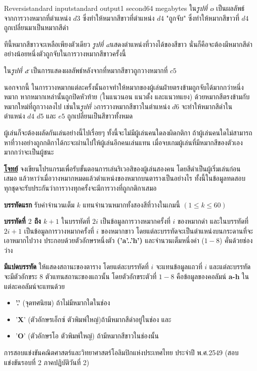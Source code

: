 \documentclass[11pt,a4paper]{article}
\begin{document}
\begin{problem}{Reversi}{standard input}{standard output}{1 second}{64 megabytes}
ใน\textit{รูปที่ ๓} เป็นผลลัพธ์จากการวางหมากที่ตำแหน่ง $d3$ ซึ่งทำให้หมากสีขาวที่ตำแหน่ง $d4$ "ถูกจับ" ซึ่งทำให้หมากสีขาวที่ $d4$ ถูกเปลี่ยนมาเป็นหมากสีดำ

ทีนี้หมากสีขาวจะเหลือเพียงตัวเดียว \textit{รูปที่ ๔}แสดงตำแหน่งที่วางได้ของสีขาว นั่นก็คือจะต้องมีหมากสีดำอย่างน้อยหนึ่งตัวถูกจับในการวางหมากสีขาวครั้งนี้

ใน\textit{รูปที่ ๕} เป็นการแสดงผลลัพธ์หลังจากที่หมากสีขาวถูกวางหมากที่ $c5$

นอกจากนี้ ในการวางหมากแต่ละครั้งนั้นอาจทำให้หมากของผู้เล่นฝ่ายตรงข้ามถูกจับได้มากกว่าหนึ่งหมาก หากหมากเหล่านั้นถูกปิดหัวท้าย (ในแนวนอน แนวตั้ง และแนวทแยง) ด้วยหมากสีตรงข้ามกับหมากใหม่ที่ถูกวางลงไป เช่นใน\textit{รูปที่ ๖}การวางหมากสีขาวในตำแหน่ง $d6$ จะทำให้หมากสีดำในตำแหน่ง $d4$ $d5$ และ $e5$ ถูกเปลี่ยนเป็นสีขาวทั้งหมด

ผู้เล่นก็จะต้องผลัดกันเล่นอย่างนี้ไปเรื่อยๆ ทั้งนี้จะไม่มีผู้เล่นคนใดลงผิดกติกา ถ้าผู้เล่นคนใดไม่สามารถหาที่วางอย่างถูกกติกาได้กะจะผ่านไปให้ผู้เล่นอีกคนเล่นแทน เมื่อจบเกมผู้เล่นที่มีหมากสีของตัวเองมากกว่าจะเป็นผู้ชนะ



\bigskip
\underline{\textbf{โจทย์}}  จงเขียนโปรแกรมเพื่อรับขั้นตอนการเล่นริเวอสิของผู้เล่นสองคน โดยสีดำเป็นผู้เริ่มเล่นก่อนเสมอ แล้วหาว่าเมื่อวางหมากหมดแล้วตำแหน่งของหมากบนตารางเป็นอย่างไร ทั้งนี้ในข้อมูลทดสอบทุกชุดจะรับประกันว่าการวางทุกครั้งจะมีการวางที่ถูกกติกาเสมอ

\InputFile

\textbf{บรรทัดแรก} รับค่าจำนวนเต็ม $k$ แทนจำนวนหมากทั้งสองสีที่วางในเกมนี้ $(1 \leq k \leq 60)$

\textbf{บรรทัดที่ $2$ ถึง $k+1$} ในบรรทัดที่ $2i$ เป็นข้อมูลการวางหมากครั้งที่ $i$ ของหมากดำ และในบรรทัดที่ $2i+1$ เป็นข้อมูลการวางหมากครั้งที่ $i$ ของหมากขาว โดยแต่ละบรรทัดจะเป็นตำแหน่งบนกระดานที่จะเอาหมากไปวาง ประกอบด้วยตัวอักษรหนึ่งตัว\textbf{ ('a'..'h')} และจำนวนเต็มหนึ่งค่า ($1-8$) คั่นด้วยช่องว่าง

\OutputFile

\textbf{มีแปดบรรทัด} ให้แสดงสถานะของตาราง โดยแต่ละบรรทัดที่ $i$ จะแทนข้อมูลแถวที่ $i$ และแต่ละบรรทัดจะมีตัวอักขระ $8$ ตัวแทนสถานะของแถวนั้น โดยตัวอักขระตัวที่ $1-8$ คือข้อมูลของคอลัมน์ \textbf{a-h} ในแต่ละคอลัมน์จะแทนด้วย
\begin{itemize}

\item \textbf{'.'} (จุดทศนิยม) ถ้าไม่มีหมากใดในช่อง
\item '\textbf{X}' (ตัวอักษรเอ็กซ์ ตัวพิมพ์ใหญ่)ถ้ามีหมากสีดำอยู่ในช่อง และ
\item '\textbf{O}' (ตัวอักษรโอ ตัวพิมพ์ใหญ่) ถ้ามีหมากสีขาวในช่องนั้น
\end{itemize}

\Examples

\begin{example}
%
\end{example}


\Source

การสอบแข่งขันคณิตศาสตร์และวิทยาศาสตร์โอลิมปิกแห่งประเทศไทย
ประจำปี พ.ศ.2549 (สอบแข่งขันรอบที่ 2 ภาคปฏิบัติวันที่ 2)

\end{problem}
\end{document}
